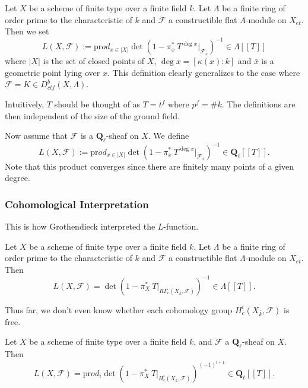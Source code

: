 \begin{definition}
Let $X$ be a scheme of finite type over a finite field $k$. Let $\Lambda$ be a finite ring of order prime to the characteristic of $k$ and $\mathcal{F}$ a constructible flat $\Lambda$-module on $X_{et}$. Then we set
$$
L(X, \mathcal{F}) := \text{pr}od_{x\in |X|}\det\left(1-\pi_x^*\ T^{\deg x}\Big|_{\mathcal{F}_{\bar x}}\right)^{-1}\in \Lambda [[ T ]]
$$
where $|X|$ is the set of closed points of $X$, $\deg x = [\kappa(x): k]$ and $\bar x$ is a geometric point lying over $x$. This definition clearly generalizes to the case where $\mathcal{F} =K \in D_{ctf}^b(X, \Lambda)$. 

\begin{remark}
Intuitively, $T$ should be thought of as $T = t^f$ where $p^f = \# k$. The definitions are then independent of the size of the ground field.
\end{remark}

Now assume that $\mathcal{F}$ is a $\mathbf{Q}_\ell$-sheaf on $X$. We define
$$
L(X, \mathcal{F}) := \text{pr}od_{x\in |X|}\det\left(1-\pi_x^*\ T^{\deg x}\Big|_{\mathcal{F}_{\bar x}}\right)^{-1}\in \mathbf{Q}_\ell [[ T ]].
$$
Note that this product converges since there are finitely many points of a given degree.
\end{definition}

\subsubsection*{Cohomological Interpretation} 

This is how Grothendieck interpreted the $L$-function.

\begin{theorem} \label{thmA} 
Let $X$ be a scheme of finite type over a finite field $k$. Let $\Lambda$ be a finite ring of order prime to the characteristic of $k$ and $\mathcal{F}$ a constructible flat $\Lambda$-module on $X_{et}$. Then
$$
L(X, \mathcal{F}) = \det\left(1-\pi_X^*\ T\Big|_{R\Gamma_c(X_{\bar k}, \mathcal{F})}\right)^{-1}\in \Lambda[[ T]].
$$
\end{theorem}

Thus far, we don't even know whether each cohomology group $H^i_c(X_{\bar k}, \mathcal{F})$ is free.

\begin{theorem} \label{thmB} 
Let $X$ be a scheme of finite type over a finite field $k$, and $\mathcal{F}$ a $\mathbf{Q}_\ell$-sheaf on $X$. Then
$$
L(X, \mathcal{F}) = \text{pr}od_i \det\left(1-\pi_X^*\ T\Big|_{H_c^i\left(X_{\bar k} , \mathcal{F}\right)}\right)^{(-1)^{i+1}}
\in \mathbf{Q}_\ell[[ T]]. 
$$
\end{theorem}

